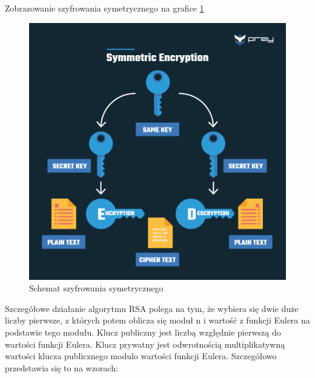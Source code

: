 Zobrazowanie szyfrowania symetrycznego na grafice \ref{fig:RSA1}
\begin{figure}[H]
    \centering
    \includegraphics[width=\textwidth]{Images/RSA1.png}
    \caption{Schemat szyfrowania symetrycznego}
    \label{fig:RSA1}
\end{figure}

\vspace{0.3\baselineskip}

Szczegółowe działanie algorytmu RSA polega na tym, że wybiera się dwie duże liczby pierwsze, z których potem oblicza się moduł n i wartość z funkcji Eulera na podstawie tego modułu. Klucz publiczny jest liczbą względnie pierwszą do wartości funkcji Eulera. Klucz prywatny jest odwrotnością multiplikatywną wartości klucza publicznego modulo wartości funkcji Eulera. Szczegółowo przedstawia się to na wzorach:

